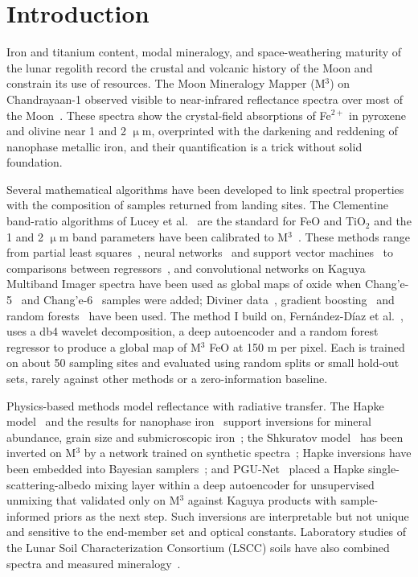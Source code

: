 \documentclass[remotesensing,article,submit,pdftex,moreauthors]{Definitions/mdpi}
\begin{document}
\hypersetup{colorlinks=true,linkcolor=black,citecolor=black,urlcolor=black}

\section{Introduction}

Iron and titanium content, modal mineralogy, and space-weathering maturity of the lunar regolith record the crustal and volcanic history of the Moon and constrain its use of resources. The Moon Mineralogy Mapper (M$^{3}$) on Chandrayaan-1 observed visible to near-infrared reflectance spectra over most of the Moon~\cite{pieters2009,green2011}. These spectra show the crystal-field absorptions of Fe$^{2+}$ in pyroxene and olivine near 1 and 2 $\upmu$m, overprinted with the darkening and reddening of nanophase metallic iron, and their quantification is a trick without solid foundation.

Several mathematical algorithms have been developed to link spectral properties with the composition of samples returned from landing sites. The Clementine band-ratio algorithms of Lucey et al.~\cite{lucey2000} are the standard for FeO and TiO$_{2}$ and the 1 and 2 $\upmu$m band parameters have been calibrated to M$^{3}$~\cite{bhatt2012,bhatt2015}. These methods range from partial least squares~\cite{sun2016}, neural networks~\cite{xia2019} and support vector machines~\cite{wang2021} to comparisons between regressors~\cite{qiu2022}, and convolutional networks on Kaguya Multiband Imager spectra have been used as global maps of oxide when Chang'e-5~\cite{yang2023,zhang2023} and Chang'e-6~\cite{shi2026} samples were added; Diviner data~\cite{ma2022}, gradient boosting~\cite{wu2024} and random forests~\cite{fernandez2025} have been used. The method I build on, Fernández-Díaz et al.~\cite{fernandez2026}, uses a db4 wavelet decomposition, a deep autoencoder and a random forest regressor to produce a global map of M$^{3}$ FeO at 150 m per pixel. Each is trained on about 50 sampling sites and evaluated using random splits or small hold-out sets, rarely against other methods or a zero-information baseline.

Physics-based methods model reflectance with radiative transfer. The Hapke model~\cite{hapke1993} and the results for nanophase iron~\cite{hapke2001,lucey2011,pieters2016} support inversions for mineral abundance, grain size and submicroscopic iron~\cite{lili2011,sunlucey2021,trang2019}; the Shkuratov model~\cite{shkuratov1999} has been inverted on M$^{3}$ by a network trained on synthetic spectra~\cite{korokhin2024}; Hapke inversions have been embedded into Bayesian samplers~\cite{jung2026}; and PGU-Net~\cite{lin2026} placed a Hapke single-scattering-albedo mixing layer within a deep autoencoder for unsupervised unmixing that validated only on M$^{3}$ against Kaguya products with sample-informed priors as the next step. Such inversions are interpretable but not unique and sensitive to the end-member set and optical constants. Laboratory studies of the Lunar Soil Characterization Consortium (LSCC) soils have also combined spectra and measured mineralogy~\cite{li2012,grumpe2018,surkov2025}.
\end{document}
